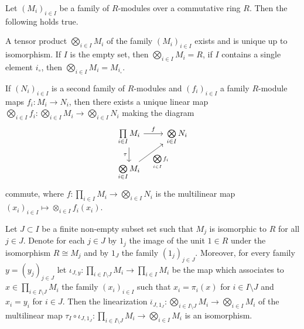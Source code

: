 \begin{theorem}\label{thm:construction-fundamental-properties-infinite-tensor-product}
  Let $(M_i)_{i\in I}$ be a family of $R$-modules over a commutative ring $R$. Then the following
  holds true.
  \begin{romanlist}
  \item
    A tensor product $\bigotimes_{i\in I}M_i$ of the family $(M_i)_{i\in I}$ exists and is
    unique up to isomorphism. 
    If $I$ is the empty set, then $\bigotimes_{i\in I}M_i = R$, if $I$ contains a single element $i_\circ$,
    then  $\bigotimes_{i\in I}M_i =M_{i_\circ}$.   
  \item
    If $(N_i)_{i\in I}$ is a second family of $R$-modules and $(f_i)_{i\in I}$ a family
    $R$-module maps $f_i :M_i \to N_i$, then there exists a unique linear map 
    $\bigotimes_{i\in I}f_i: \bigotimes_{i\in I}M_i \to \bigotimes_{i\in I}N_i$ making
    the  diagram
    \begin{displaymath}
    \begin{tikzcd}
       \prod\limits_{i\in I}M_i  \ar[d,"\tau",swap] \ar[r,"f"] & \bigotimes\limits_{i\in I}N_i   \\
       \bigotimes\limits_{i\in I}M_i \ar[ru,"\bigotimes\limits_{i\in I}f_i",swap]
   \end{tikzcd}
   \end{displaymath}
   commute, where $f:\prod_{i\in I}M_i\to \bigotimes_{i\in I}N_i$ is the multilinear map
   $(x_i)_{i\in I}\mapsto \otimes_{i\in I} f_i(x_i)$.
 \item
   Let $J\subset I$ be a finite non-empty subset set such that  $M_j$ is isomorphic  to $R$ for all $j\in J$.
   Denote for each $j\in J$ by $1_j$ the image of the unit $1\in R$ under the isomorphism $R\cong M_j$
   and by $1_J$ the family $(1_j)_{j\in J}$. Moreover, for every family $y =(y_j)_{j\in J}$
   let $\iota_{J,y} : \prod_{i\in I\setminus J} M_i \to \prod_{i\in I}M_i$ be the map which associates
   to $x\in\prod_{i\in I\setminus J} M_i$ the family $ (x_i)_{i\in I}$ such that $x_i =\pi_i (x)$ for
   $i \in I\setminus J$ and  $x_i = y_i$ for $i \in J$. Then the linearization
   $\overline{\iota}_{J,1_J}: \bigotimes_{i\in I\setminus J}M_i \to  \bigotimes_{i\in I}M_i $ of the multilinear map
   $\tau_I \circ \iota_{J,1_J}: \prod_{i\in I\setminus J}M_i \to  \bigotimes_{i\in I}M_i$ is an isomorphism. 
  \end{romanlist}
\end{theorem} 

